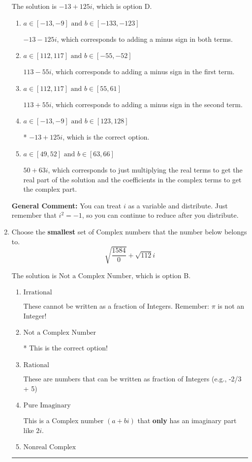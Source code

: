 \documentclass{extbook}[14pt]
\newcommand{\litem}[1]{\item #1

\rule{\textwidth}{0.4pt}}
\begin{document}
\begin{enumerate}
{The solution is \( -13 + 125 i \), which is option D.\begin{enumerate}[label=\Alph*.]
\item \( a \in [-13, -9] \text{ and } b \in [-133, -123] \)

 $-13 - 125 i$, which corresponds to adding a minus sign in both terms.
\item \( a \in [112, 117] \text{ and } b \in [-55, -52] \)

 $113 - 55 i$, which corresponds to adding a minus sign in the first term.
\item \( a \in [112, 117] \text{ and } b \in [55, 61] \)

 $113 + 55 i$, which corresponds to adding a minus sign in the second term.
\item \( a \in [-13, -9] \text{ and } b \in [123, 128] \)

* $-13 + 125 i$, which is the correct option.
\item \( a \in [49, 52] \text{ and } b \in [63, 66] \)

 $50 + 63 i$, which corresponds to just multiplying the real terms to get the real part of the solution and the coefficients in the complex terms to get the complex part.
\end{enumerate}

\textbf{General Comment:} You can treat $i$ as a variable and distribute. Just remember that $i^2=-1$, so you can continue to reduce after you distribute.
}
\litem{
Choose the \textbf{smallest} set of Complex numbers that the number below belongs to.
\[ \sqrt{\frac{1584}{0}}+\sqrt{112} i \]

The solution is \( \text{Not a Complex Number} \), which is option B.\begin{enumerate}[label=\Alph*.]
\item \( \text{Irrational} \)

These cannot be written as a fraction of Integers. Remember: $\pi$ is not an Integer!
\item \( \text{Not a Complex Number} \)

* This is the correct option!
\item \( \text{Rational} \)

These are numbers that can be written as fraction of Integers (e.g., -2/3 + 5)
\item \( \text{Pure Imaginary} \)

This is a Complex number $(a+bi)$ that \textbf{only} has an imaginary part like $2i$.
\item \( \text{Nonreal Complex} \)


\end{enumerate}}
\end{enumerate}
\end{document}
